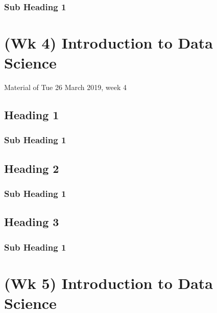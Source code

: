 \documentclass[]{book}
\begin{document}
\hypertarget{sub-heading-1-5}{%
\subsection{Sub Heading 1}\label{sub-heading-1-5}}

\hypertarget{wk-4-introduction-to-data-science}{%
\chapter{(Wk 4) Introduction to Data Science}\label{wk-4-introduction-to-data-science}}

Material of Tue 26 March 2019, week 4

\hypertarget{heading-1-2}{%
\section{Heading 1}\label{heading-1-2}}

\hypertarget{sub-heading-1-6}{%
\subsection{Sub Heading 1}\label{sub-heading-1-6}}

\hypertarget{heading-2-2}{%
\section{Heading 2}\label{heading-2-2}}

\hypertarget{sub-heading-1-7}{%
\subsection{Sub Heading 1}\label{sub-heading-1-7}}

\hypertarget{heading-3-2}{%
\section{Heading 3}\label{heading-3-2}}

\hypertarget{sub-heading-1-8}{%
\subsection{Sub Heading 1}\label{sub-heading-1-8}}

\hypertarget{wk-5-introduction-to-data-science}{%
\chapter{(Wk 5) Introduction to Data Science}\label{wk-5-introduction-to-data-science}}
\end{document}
